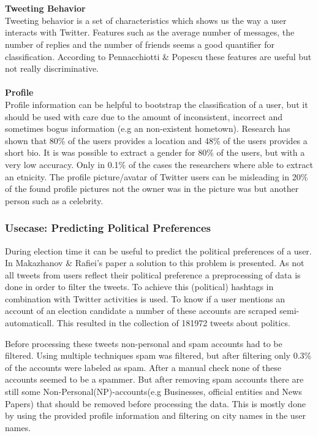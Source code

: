 \documentclass{article}
\begin{document}
\\\\  
\textbf{Tweeting Behavior}\\
Tweeting behavior is a set of characteristics which shows us the way a user interacts with Twitter. Features such as the average number of messages, the number of replies and the number of friends seems a good quantifier for classification. According to Pennacchiotti \& Popescu these features are useful but not really discriminative. \cite{userclasst} 
\\\\
\textbf{Profile}\\
Profile information can be helpful to bootstrap the classification of a user, but it should be used with care due to the amount of inconsistent, incorrect and sometimes bogus information (e.g an non-existent hometown). Research has shown that 80\% of the users provides a location and 48\% of the users provides a short bio. \cite{usermachine} It is was possible to extract a gender for 80\% of the users, but with a very low accuracy. Only in 0.1\% of the cases the researchers where able to extract an etnicity. The profile picture/avatar of Twitter users can be misleading in 20\% of the found profile pictures not the owner was in the picture was but another person such as a celebrity.  \cite{usermachine}

\subsubsection{Usecase: Predicting Political Preferences}
During election time it can be useful to predict the political preferences of a user. In Makazhanov \& Raﬁei's paper a solution to this problem is presented. As not all tweets from users reflect their political preference a preprocessing of data is done in order to filter the tweets. \cite{pol} To achieve this (political) hashtags in combination with Twitter activities is used. To know if a user mentions an account of an election candidate a number of these accounts are scraped semi-automaticall. This resulted in the collection of 181972 tweets about politics.\cite{pol}

Before processing these tweets non-personal and spam accounts had to be filtered. Using multiple techniques spam was filtered, but after filtering only 0.3\% of the accounts were labeled as spam. After a manual check none of these accounts seemed to be a spammer. But after removing spam accounts there are still some Non-Personal(NP)-accounts(e.g Businesses, official entities and News Papers)  that should be removed before processing the data. This is mostly done by using the provided profile information and filtering on city names in the user names.  \cite{pol}
\end{document}
